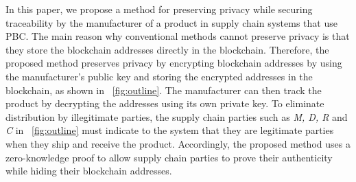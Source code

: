 \documentclass[conference]{IEEEtran}
\begin{document}

In this paper, we propose a method for preserving privacy while securing traceability by the manufacturer of a product in supply chain systems that use PBC.
The main reason why conventional methods cannot preserve privacy is that they store the blockchain addresses directly in the blockchain.
Therefore, the proposed method preserves privacy by encrypting blockchain addresses by using the manufacturer's public key and storing the encrypted addresses in the blockchain, as shown in \figurename~\ref{fig:outline}.
The manufacturer can then track the product by decrypting the addresses using its own private key.
To eliminate %
distribution by %
illegitimate %
parties, the %
supply chain parties such as \textit{M, D, R} and \textit{C} in \figurename~\ref{fig:outline} %
must indicate to the system that they are legitimate %
parties when they ship and receive the product.
Accordingly, the proposed method uses a zero-knowledge proof to allow %
supply chain parties to prove their authenticity %
while hiding %
their blockchain addresses.
\end{document}
